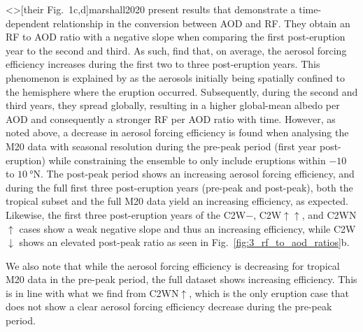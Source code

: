 \documentclass[draft]{agujournal2019}
\begin{document}
\citeA<>[their Fig.\ 1c,d]{marshall2020} present results that demonstrate a
time-dependent relationship in the conversion between AOD and RF. They obtain an RF to
AOD ratio with a negative slope when comparing the first post-eruption year to the
second and third. As such,  find that, on average, the aerosol
forcing efficiency increases during the first two to three post-eruption years. This
phenomenon is explained by  as the aerosols initially being
spatially confined to the hemisphere where the eruption occurred. Subsequently, during
the second and third years, they spread globally, resulting in a higher global-mean
albedo per AOD and consequently a stronger RF per AOD ratio with time. However, as noted
above, a decrease in aerosol forcing efficiency is found when analysing the M20 data
with seasonal resolution during the pre-peak period (first year post-eruption) while
constraining the ensemble to only include eruptions within \(-10\) to
\(\SI{10}{\degree\mathrm{N}}\). The post-peak period shows an increasing aerosol forcing
efficiency, and during the full first three post-eruption years (pre-peak and
post-peak), both the tropical subset and the full M20 data yield an increasing
efficiency, as expected. Likewise, the first three post-eruption years of the C2W\(-\),
C2W\(\uparrow\uparrow\), and C2WN\(\uparrow\) cases show a weak negative slope and thus
an increasing efficiency, while C2W\(\downarrow\) shows an elevated post-peak ratio as
seen in Fig.~\ref{fig:3_rf_to_aod_ratios}b.

We also note that while the aerosol forcing efficiency is decreasing for tropical M20
data in the pre-peak period, the full dataset shows increasing efficiency. This is in
line with what we find from C2WN\(\uparrow\), which is the only eruption case that does
not show a clear aerosol forcing efficiency decrease during the pre-peak period.
\end{document}
